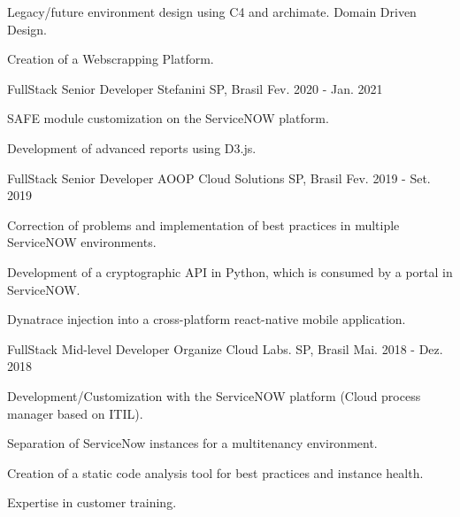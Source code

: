 \begin{cventries}
{\begin{cvitems}
			\item {Legacy/future environment design using C4 and archimate. Domain Driven Design.}
			\item {Creation of a Webscrapping Platform.}					
		\end{cvitems}
	} 
     \cventry
    {FullStack Senior Developer} %
    {Stefanini} %
    {SP, Brasil} %
    {Fev. 2020 - Jan. 2021} %
    {
    	\begin{cvitems} %
    		\item {SAFE module customization on the ServiceNOW platform.}
    		\item {Development of advanced reports using D3.js.}    		
    	\end{cvitems}
    }
    \cventry
    {FullStack Senior Developer} %
    {AOOP Cloud Solutions} %
    {SP, Brasil} %
    {Fev. 2019 - Set. 2019} %
    {
      \begin{cvitems} %
        \item {Correction of problems and implementation of best practices in multiple ServiceNOW environments.}
        \item {Development of a cryptographic API in Python, which is consumed by a portal in ServiceNOW.}
        \item {Dynatrace injection into a cross-platform react-native mobile application.}
      \end{cvitems}
    }   
	\cventry
	{FullStack Mid-level Developer} %
	{Organize Cloud Labs.} %
	{SP, Brasil} %
	{Mai. 2018 - Dez. 2018} %
	{
		\begin{cvitems} %
			\item {Development/Customization with the ServiceNOW platform (Cloud process manager based on ITIL).}
			\item {Separation of ServiceNow instances for a multitenancy environment.}
			\item {Creation of a static code analysis tool for best practices and instance health.}
			\item {Expertise in customer training.}
		\end{cvitems}
	}
\end{cventries}

